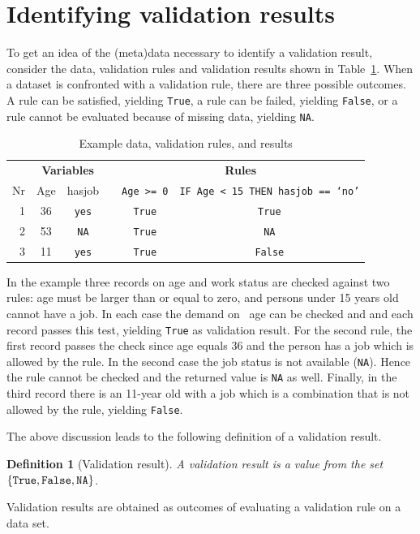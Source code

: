 \documentclass[a4paper, 11pt]{article}
\newtheorem{definition}{Definition}
\newcommand{\code}[1]{\texttt{#1}}
\newcommand{\waar}{{\normalfont \texttt{True}}}
\newcommand{\onwaar}{{\normalfont \texttt{False}}}
\newcommand{\na}{{\normalfont \texttt{NA}}}
\begin{document}
\section{Identifying validation results}
To get an idea of the (meta)data necessary to identify a validation result,
consider the data, validation rules and validation results shown in
Table~\ref{tab:example1}. When a dataset is confronted with a validation rule,
there are three possible outcomes. A rule can be satisfied, yielding \waar{}, a
rule can be failed, yielding \onwaar{}, or a rule cannot be evaluated because
of missing data, yielding \na{}.
%
\begin{table}
\centering
\caption{Example data, validation rules, and results}
\begin{tabular}{rccccb{4cm}}
\hline
&\multicolumn{2}{c}{\textbf{Variables}}&&\multicolumn{2}{c}{\textbf{Rules}}\\
Nr  & Age  & hasjob     && \code{Age >= 0} & \code{IF Age < 15 THEN hasjob == `no'}\\
\cline{2-3}\cline{5-6}
1   & 36   & \code{yes} && \waar{}        & \multicolumn{1}{c}{\waar{}}\\
2   & 53   & \code{NA}  && \waar{}        & \multicolumn{1}{c}{\na{}}\\
3   & 11   & \code{yes} && \waar{}        & \multicolumn{1}{c}{\onwaar{}}\\
\hline
\end{tabular}
\label{tab:example1}
\end{table}



In the example three records on age and work status are checked against two
rules: age must be larger than or equal to zero, and persons under 15 years old
cannot have a job. In each case the demand on  age can be checked and and each
record passes this test, yielding \waar{} as validation result. For the second
rule, the first record passes the check since age equals 36 and the person has
a job which is allowed by the rule. In the second case the job status is not
available (\na{}). Hence the rule cannot be checked and the returned value is \na{}
as well. Finally, in the third record there is an 11-year old with a job which
is a combination that is not allowed by the rule, yielding \onwaar{}.


The above discussion leads to the following definition of a validation result.
%
\begin{definition}[Validation result]
A validation result is a value from the set $\{\waar{},\onwaar{},\na{}\}$.
\label{def:validationresult}
\end{definition}
Validation results are obtained as outcomes of evaluating a validation rule on
a data set.
\end{document}
